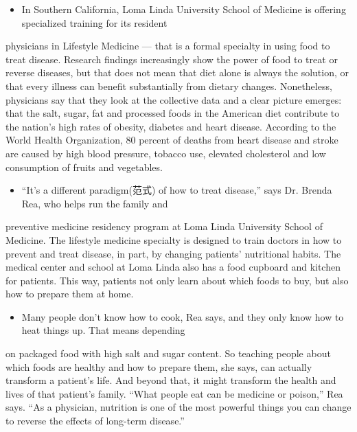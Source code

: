\documentclass[UTF8,11pt]{ctexart}
\begin{document}
\begin{itemize}[leftmargin=2em,itemsep=.2em,topsep=.4em]\item[G.] In Southern California, Loma Linda University School of Medicine is offering specialized training for its resident
\end{itemize}

physicians in Lifestyle Medicine — that is a formal specialty in using food to treat disease. Research findings increasingly show the power of food to treat or reverse diseases, but that does not mean that diet alone is always the solution, or that every illness can benefit substantially from dietary changes. Nonetheless, physicians say that they look at the collective data and a clear picture emerges: that the salt, sugar, fat and processed foods in the American diet contribute to the nation’s high rates of obesity, diabetes and heart disease. According to the World Health Organization, 80 percent of deaths from heart disease and stroke are caused by high blood pressure, tobacco use, elevated cholesterol and low consumption of fruits and vegetables.


\begin{itemize}[leftmargin=2em,itemsep=.2em,topsep=.4em]\item[H.] “It’s a different paradigm(范式) of how to treat disease,” says Dr. Brenda Rea, who helps run the family and
\end{itemize}

preventive medicine residency program at Loma Linda University School of Medicine. The lifestyle medicine specialty is designed to train doctors in how to prevent and treat disease, in part, by changing patients’ nutritional habits. The medical center and school at Loma Linda also has a food cupboard and kitchen for patients. This way, patients not only learn about which foods to buy, but also how to prepare them at home.


\begin{itemize}[leftmargin=2em,itemsep=.2em,topsep=.4em]\item[I.] Many people don’t know how to cook, Rea says, and they only know how to heat things up. That means depending
\end{itemize}

on packaged food with high salt and sugar content. So teaching people about which foods are healthy and how to prepare them, she says, can actually transform a patient’s life. And beyond that, it might transform the health and lives of that patient’s family. “What people eat can be medicine or poison,” Rea says. “As a physician, nutrition is one of the most powerful things you can change to reverse the effects of long-term disease.”
\end{document}
